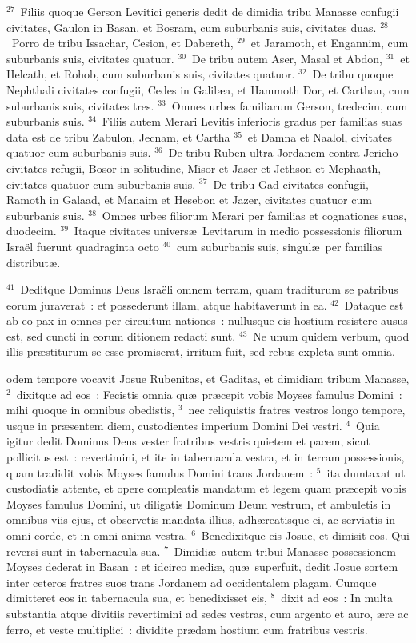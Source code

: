 ${}^{27}$~Filiis quoque Gerson Levitici generis dedit de dimidia tribu Manasse confugii civitates, Gaulon in Basan, et Bosram, cum suburbanis suis, civitates duas.
${}^{28}$~Porro de tribu Issachar, Cesion, et Dabereth,
${}^{29}$~et Jaramoth, et Engannim, cum suburbanis suis, civitates quatuor.
${}^{30}$~De tribu autem Aser, Masal et Abdon,
${}^{31}$~et Helcath, et Rohob, cum suburbanis suis, civitates quatuor.
${}^{32}$~De tribu quoque Nephthali civitates confugii, Cedes in Galil\ae a, et Hammoth Dor, et Carthan, cum suburbanis suis, civitates tres.
${}^{33}$~Omnes urbes familiarum Gerson, tredecim, cum suburbanis suis.
${}^{34}$~Filiis autem Merari Levitis inferioris gradus per familias suas data est de tribu Zabulon, Jecnam, et Cartha
${}^{35}$~et Damna et Naalol, civitates quatuor cum suburbanis suis.
${}^{36}$~De tribu Ruben ultra Jordanem contra Jericho civitates refugii, Bosor in solitudine, Misor et Jaser et Jethson et Mephaath, civitates quatuor cum suburbanis suis.
${}^{37}$~De tribu Gad civitates confugii, Ramoth in Galaad, et Manaim et Hesebon et Jazer, civitates quatuor cum suburbanis suis.
${}^{38}$~Omnes urbes filiorum Merari per familias et cognationes suas, duodecim.
${}^{39}$~Itaque civitates univers\ae\ Levitarum in medio possessionis filiorum Isra\"el fuerunt quadraginta octo
${}^{40}$~cum suburbanis suis, singul\ae\ per familias distribut\ae .


${}^{41}$~Deditque Dominus Deus Isra\"eli omnem terram, quam traditurum se patribus eorum juraverat~: et possederunt illam, atque habitaverunt in ea.
${}^{42}$~Dataque est ab eo pax in omnes per circuitum nationes~: nullusque eis hostium resistere ausus est, sed cuncti in eorum ditionem redacti sunt.
${}^{43}$~Ne unum quidem verbum, quod illis pr\ae stiturum se esse promiserat, irritum fuit, sed rebus expleta sunt omnia.

\bchapter
{}odem tempore vocavit Josue Rubenitas, et Gaditas, et dimidiam tribum Manasse,
${}^{2}$~dixitque ad eos~: Fecistis omnia qu\ae\ pr\ae cepit vobis Moyses famulus Domini~: mihi quoque in omnibus obedistis,
${}^{3}$~nec reliquistis fratres vestros longo tempore, usque in pr\ae sentem diem, custodientes imperium Domini Dei vestri.
${}^{4}$~Quia igitur dedit Dominus Deus vester fratribus vestris quietem et pacem, sicut pollicitus est~: revertimini, et ite in tabernacula vestra, et in terram possessionis, quam tradidit vobis Moyses famulus Domini trans Jordanem~:
${}^{5}$~ita dumtaxat ut custodiatis attente, et opere compleatis mandatum et legem quam pr\ae cepit vobis Moyses famulus Domini, ut diligatis Dominum Deum vestrum, et ambuletis in omnibus viis ejus, et observetis mandata illius, adh\ae reatisque ei, ac serviatis in omni corde, et in omni anima vestra.
${}^{6}$~Benedixitque eis Josue, et dimisit eos. Qui reversi sunt in tabernacula sua.
${}^{7}$~Dimidi\ae\ autem tribui Manasse possessionem Moyses dederat in Basan~: et idcirco medi\ae , qu\ae\ superfuit, dedit Josue sortem inter ceteros fratres suos trans Jordanem ad occidentalem plagam. Cumque dimitteret eos in tabernacula sua, et benedixisset eis,
${}^{8}$~dixit ad eos~: In multa substantia atque divitiis revertimini ad sedes vestras, cum argento et auro, \ae re ac ferro, et veste multiplici~: dividite pr\ae dam hostium cum fratribus vestris.


